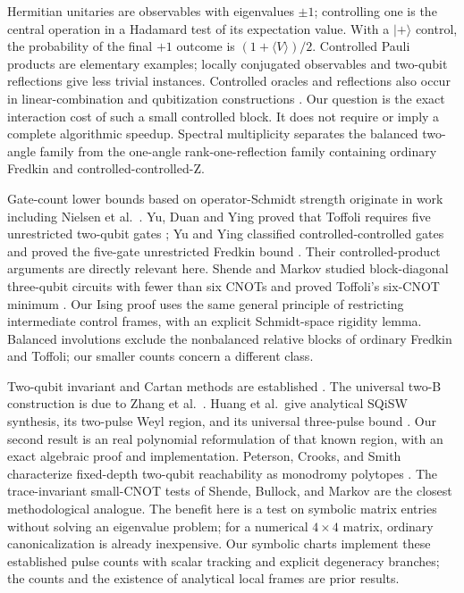 \documentclass[a4paper,onecolumn,11pt,unpublished]{quantumarticle}
\begin{document}
Hermitian unitaries are observables with eigenvalues $\pm1$; controlling one
is the central operation in a Hadamard test of its expectation value.
With a $|+\rangle$ control, the probability of the final $+1$ outcome is
$(1+\langle V\rangle)/2$. Controlled Pauli products are elementary examples;
locally conjugated observables and two-qubit reflections give less trivial
instances. Controlled oracles and reflections also occur in linear-combination
and qubitization constructions \cite{qubitization}. Our question is the exact
interaction cost of such a small controlled block. It does not require or
imply a complete algorithmic speedup. Spectral multiplicity separates the
balanced two-angle family from the one-angle rank-one-reflection family
containing ordinary Fredkin and controlled-controlled-Z.

Gate-count lower bounds based on operator-Schmidt strength originate in
work including Nielsen et al.\ \cite{nielsen}. Yu, Duan and Ying proved that
Toffoli requires five unrestricted two-qubit gates \cite{yuduan}; Yu and Ying
classified controlled-controlled gates and proved the five-gate unrestricted
Fredkin bound \cite{yuying}. Their controlled-product arguments are directly
relevant here. Shende and Markov studied block-diagonal three-qubit circuits
with fewer than six CNOTs and proved Toffoli's six-CNOT minimum
\cite{toffolicnot}. Our Ising proof uses the same general principle of
restricting intermediate control frames, with an explicit Schmidt-space
rigidity lemma. Balanced involutions exclude the nonbalanced relative
blocks of ordinary Fredkin and Toffoli; our smaller counts concern a
different class.

Two-qubit invariant and Cartan methods are established \cite{makhlin,shende}.
The universal two-B construction is due to Zhang et al.\ \cite{bgate}.
Huang et al.\ give analytical SQiSW synthesis, its two-pulse Weyl region,
and its universal three-pulse bound \cite{sqisw}. Our second result is an
real polynomial reformulation of that known region, with an exact algebraic
proof and implementation. Peterson, Crooks, and Smith characterize fixed-depth
two-qubit reachability as monodromy polytopes \cite{peterson}. The
trace-invariant small-CNOT tests of Shende, Bullock, and Markov
\cite{shende} are the closest methodological analogue. The benefit here is a
test on symbolic matrix entries without solving an eigenvalue problem; for a
numerical $4\times4$ matrix, ordinary canonicalization is already inexpensive. Our symbolic charts implement these established pulse
counts with scalar tracking and explicit degeneracy branches; the counts
and the existence of analytical local frames are prior results.
\end{document}
